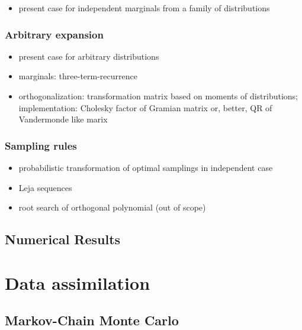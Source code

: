 \begin{itemize}
\item present case for independent marginals from a family of
  distributions
\end{itemize}

\subsection{Arbitrary expansion}
\label{sec:arbitrary-expansion}

\begin{itemize}
\item present case for arbitrary distributions
\item marginals: three-term-recurrence
\item orthogonalization: transformation matrix based on moments of
  distributions; implementation: Cholesky factor of Gramian matrix or,
  better, QR of Vandermonde like marix
\end{itemize}

\subsection{Sampling rules}
\label{sec:sampling-rules}

\begin{itemize}
\item probabilistic transformation of optimal samplings in independent
  case
\item Leja sequences
\item root search of orthogonal polynomial (out of scope)
\end{itemize}

\section{Numerical Results}
\label{sec:up-numerical-results}


\chapter{Data assimilation}
\label{cha:data-assimilation}

\section{Markov-Chain Monte Carlo}
\label{sec:markov-chain-monte}



